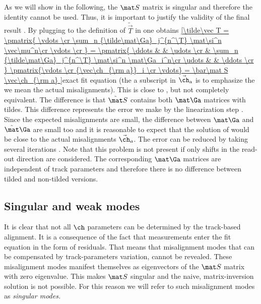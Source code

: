 As we will show in the following, the $\mat S$ matrix is singular and therefore the identity  cannot be used. Thus, it is important to justify the validity of the final result . By plugging  to the definition of $\tilde\vec T$ in  one obtains
\eqref{\tilde\vec T =
\pmatrix{
\vdots \cr
\sum_n {\tilde\mat\Ga}_j^{n^\T} \mat\si^n \vec\mu^n\cr
\vdots \cr
}
=
\pmatrix{
\ddots & & \udots \cr
 & \sum_n {\tilde\mat\Ga}_j^{n^\T} \mat\si^n \mat\Ga_i^n\cr
\udots & & \ddots \cr
}
\pmatrix{\vdots \cr {\vec\ch_{\rm a}}_i \cr \vdots}
=
\bar\mat S \vec\ch_{\rm a}
}{exact fit equation}
(the a subscript in $\vec\ch_{\rm a}$ is to emphasize the we mean the actual misalignments). This is close to , but not completely equivalent. The difference is that $\tilde\mat S$ contains both $\mat\Ga$ matrices with tildes. This difference represents the error we make by the linearization step . Since the expected misalignments are small, the difference between $\mat\Ga$ and $\tilde\mat\Ga$ are small too and it is reasonable to expect that the solution of  would be close to the actual misalignments $\vec\ch_a$. The error can be reduced by taking several iterations . Note that this problem is not present if only shifts in the read-out direction are considered. The corresponding $\mat\Ga$ matrices are independent of track parameters and therefore there is no difference between tilded and non-tilded versions.

\subsection[al sing modes]{Singular and weak modes}

It is clear that not all $\ch$ parameters can be determined by the track-based alignment. It is a consequence of the fact that measurements enter the fit equation  in the form of residuals. That means that misalignment modes that can be compensated by track-parameters variation, cannot be revealed. These misalignment modes manifest themselves as eigenvectors of the $\mat S$ matrix with zero eigenvalue. This makes $\mat S$ singular and the naive, matrix-inversion solution  is not possible. For this reason we will refer to such misalignment modes as \em{singular modes}.



